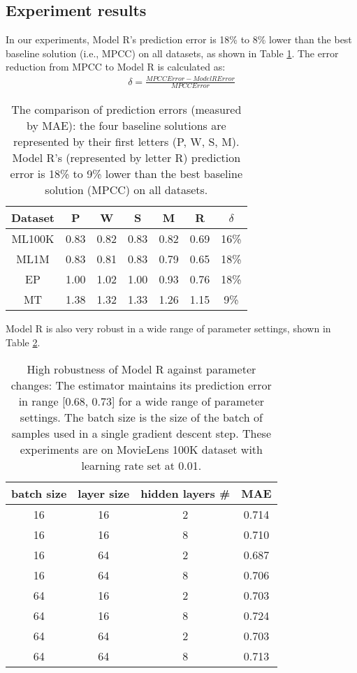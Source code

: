 \documentclass[conference]{IEEEtran}
\begin{document}
\subsection{Experiment results}
In our experiments, Model R's prediction error is 18\% to 8\% lower than
the best baseline solution (i.e., MPCC) on all datasets, as shown in Table 
\ref{tab:errors}.
The error reduction from MPCC to Model R is calculated as:
\begin{align*}
\delta = \frac{MPCCError - ModelRError}{MPCCError}
\end{align*}
\begin{table}[!ht]
	\centering
	\caption{The comparison of prediction errors (measured by MAE): 
		the four baseline solutions are represented by their first letters (P, W, S, M).
		Model R's (represented by letter R) prediction error is 18\% to 9\% 
		lower than the best baseline 
		solution (MPCC) on all datasets.
	}
	\begin{tabular}{ccccccc} \hline
		Dataset & P    & W    & S    & M    & R    & $ \delta $ \\ \hline
		ML100K  & 0.83 & 0.82 & 0.83 & 0.82 & 0.69 & 16\% \\ \hline
		ML1M    & 0.83 & 0.81 & 0.83 & 0.79 & 0.65 & 18\% \\ \hline
		EP      & 1.00 & 1.02 & 1.00 & 0.93 & 0.76 & 18\% \\ \hline
		MT      & 1.38 & 1.32 & 1.33 & 1.26 & 1.15 & 9\%  \\ \hline
	\end{tabular}
	\label{tab:errors}
\end{table}
Model R is also very robust in a wide range of parameter settings, shown in 
Table \ref{tab:robust}.
\begin{table}[!ht]
	\centering
	\caption{High robustness of Model R against parameter changes:
		The estimator maintains its prediction error in range [0.68, 0.73] for 
		a wide range of parameter settings. The batch size is the size of the 
		batch of samples used in a single gradient descent step.
		These experiments are on MovieLens 100K dataset with learning rate set 
		at 0.01.
	}
	\begin{tabular}{cccc}  \hline
		batch size & layer size & hidden layers \# & MAE \\ \hline
		16 & 16 & 2 & 0.714 \\ \hline
		16 & 16 & 8 & 0.710 \\ \hline
		16 & 64 & 2 & 0.687 \\ \hline
		16 & 64 & 8 & 0.706 \\ \hline
		64 & 16 & 2 & 0.703 \\ \hline
		64 & 16 & 8 & 0.724 \\ \hline
		64 & 64 & 2 & 0.703 \\ \hline
		64 & 64 & 8 & 0.713 \\ \hline
	\end{tabular}
	\label{tab:robust}
\end{table}
\end{document}
